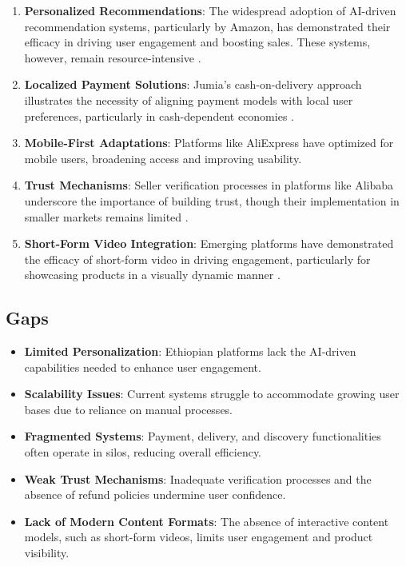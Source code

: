 \documentclass[12pt]{report}
\begin{document}
\begin{enumerate}
	\item \textbf{Personalized Recommendations}: The widespread adoption of AI-driven
	      recommendation systems, particularly by Amazon, has demonstrated their efficacy in
	      driving user engagement and boosting sales. These systems, however, remain
	      resource-intensive \cite{c16}.
	\item \textbf{Localized Payment Solutions}: Jumia’s cash-on-delivery approach illustrates the
	      necessity of aligning payment models with local user preferences, particularly in
	      cash-dependent economies \cite{c18}.
	\item \textbf{Mobile-First Adaptations}: Platforms like AliExpress have optimized for mobile
	      users, broadening access and improving usability. \cite{c17}
	\item \textbf{Trust Mechanisms}: Seller verification processes in platforms like Alibaba
	      underscore the importance of building trust, though their implementation in smaller
	      markets remains limited \cite{c16}.
	\item \textbf{Short-Form Video Integration}: Emerging platforms have demonstrated the efficacy
	      of short-form video in driving engagement, particularly for showcasing products in a
	      visually dynamic manner \cite{c19}.
\end{enumerate}

\subsection*{Gaps}

\begin{itemize}
	\item \textbf{Limited Personalization}: Ethiopian platforms lack the AI-driven capabilities needed
	      to enhance user engagement.
	\item \textbf{Scalability Issues}: Current systems struggle to accommodate growing user bases due
	      to reliance on manual processes.
	\item \textbf{Fragmented Systems}: Payment, delivery, and discovery functionalities often operate
	      in silos, reducing overall efficiency.
	\item \textbf{Weak Trust Mechanisms}: Inadequate verification processes and the absence of
	      refund policies undermine user confidence.
	\item \textbf{Lack of Modern Content Formats}: The absence of interactive content models, such
	      as short-form videos, limits user engagement and product visibility.
\end{itemize}
\end{document}
